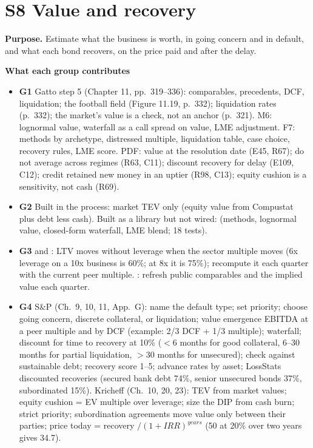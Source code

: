 \documentclass[11pt]{article}
\newcommand{\GA}{\textcolor{gA}{\textbf{G1}}}
\newcommand{\GB}{\textcolor{gB}{\textbf{G2}}}
\newcommand{\GC}{\textcolor{gC}{\textbf{G3}}}
\newcommand{\GD}{\textcolor{gD}{\textbf{G4}}}
\newcommand{\fld}[1]{\par\medskip\noindent\textbf{\textcolor{steel}{#1}}\par\nopagebreak}
\begin{document}
\section{S8 Value and recovery}\label{s8}

\textbf{Purpose.} Estimate what the business is worth, in going concern and in default, and what each bond recovers, on the price paid and after the delay.

\fld{What each group contributes}
\begin{itemize}
\item \GA{} Gatto step 5 (Chapter 11, pp.~319--336): comparables, precedents, DCF, liquidation; the football field (Figure 11.19, p.~332); liquidation rates (p.~332); the market's value is a check, not an anchor (p.~321). M6: lognormal value, waterfall as a call spread on value, LME adjustment. F7: methods by archetype, distressed multiple, liquidation table, case choice, recovery rules, LME score. PDF: value at the resolution date (E45, R67); do not average across regimes (R63, C11); discount recovery for delay (E109, C12); credit retained new money in an uptier (R98, C13); equity cushion is a sensitivity, not cash (R69).
\item \GB{} Built in the process: market TEV only (equity value from Compustat plus debt less cash). Built as a library but not wired:  (methods, lognormal value, closed-form waterfall, LME blend; 18 tests).
\item \GC{}  and : LTV moves without leverage when the sector multiple moves (6x leverage on a 10x business is 60\%; at 8x it is 75\%); recompute it each quarter with the current peer multiple. : refresh public comparables and the implied value each quarter.
\item \GD{} S\&P (Ch.~9, 10, 11, App.~G): name the default type; set priority; choose going concern, discrete collateral, or liquidation; value emergence EBITDA at a peer multiple and by DCF (example: 2/3 DCF + 1/3 multiple); waterfall; discount for time to recovery at 10\% ($<6$ months for good collateral, 6--30 months for partial liquidation, $>30$ months for unsecured); check against sustainable debt; recovery score 1--5; advance rates by asset; LossStats discounted recoveries (secured bank debt 74\%, senior unsecured bonds 37\%, subordinated 15\%). Kricheff (Ch.~10, 20, 23): TEV from market values; equity cushion = EV multiple over leverage; size the DIP from cash burn; strict priority; subordination agreements move value only between their parties; price today = recovery $/(1+IRR)^{years}$ (50 at 20\% over two years gives 34.7).
\end{itemize}
\end{document}
